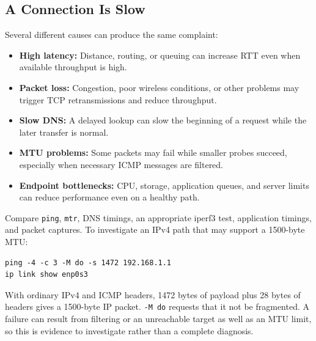 \documentclass[journal]{IEEEtran}
\begin{document}
\subsection{A Connection Is Slow}
Several different causes can produce the same complaint:
\begin{itemize}
    \item \textbf{High latency:} Distance, routing, or queuing can increase RTT even when available throughput is high.
    \item \textbf{Packet loss:} Congestion, poor wireless conditions, or other problems may trigger TCP retransmissions and reduce throughput.
    \item \textbf{Slow DNS:} A delayed lookup can slow the beginning of a request while the later transfer is normal.
    \item \textbf{MTU problems:} Some packets may fail while smaller probes succeed, especially when necessary ICMP messages are filtered.
    \item \textbf{Endpoint bottlenecks:} CPU, storage, application queues, and server limits can reduce performance even on a healthy path.
\end{itemize}
Compare \texttt{ping}, \texttt{mtr}, DNS timings, an appropriate iperf3 test, application timings, and packet captures. To investigate an IPv4 path that may support a 1500-byte MTU:
\begin{lstlisting}
ping -4 -c 3 -M do -s 1472 192.168.1.1
ip link show enp0s3
\end{lstlisting}
With ordinary IPv4 and ICMP headers, 1472 bytes of payload plus 28 bytes of headers gives a 1500-byte IP packet. \texttt{-M do} requests that it not be fragmented. A failure can result from filtering or an unreachable target as well as an MTU limit, so this is evidence to investigate rather than a complete diagnosis.
\end{document}
